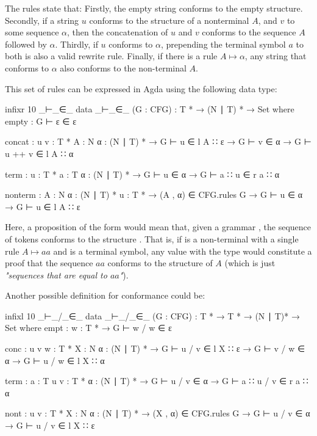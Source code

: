	The rules state that: Firstly, the empty string conforms to the empty
	structure. Secondly, if a string $u$ conforms to the structure of a
	nonterminal $A$, and $v$ to some sequence $\alpha$, then the concatenation
	of $u$ and $v$ conforms to the sequence $A$ followed by $\alpha$. Thirdly,
	if $u$ conforms to $\alpha$, prepending the terminal symbol $a$ to both is
	also a valid rewrite rule. Finally, if there is a rule $A \mapsto \alpha$,
	any string that conforms to $\alpha$ also conforms to the non-terminal $A$.

	This set of rules can be expressed in Agda using the following data type:

	\begin{code}
		infixr 10 _⊢_∈_
		data _⊢_∈_ (G : CFG) :  T * → (N ∣ T) * → Set where
		  empty :
		    G ⊢ ε ∈ ε

		  concat : {u v : T *} {A : N} {α : (N ∣ T) *} →
		    G ⊢ u ∈ l A ∷ ε → G ⊢ v ∈ α → G ⊢ u ++ v ∈ l A ∷ α

		  term : {u : T *} {a : T} {α : (N ∣ T) *} →
		    G ⊢ u ∈ α → G ⊢ a ∷ u ∈ r a ∷ α

		  nonterm : {A : N} {α : (N ∣ T) *} {u : T *} →
		    (A , α) ∈ CFG.rules G → G ⊢ u ∈ α → G ⊢ u ∈ l A ∷ ε
	\end{code}

	Here, a proposition of the form  would mean that, given a
	grammar , the sequence of tokens  conforms to the
	structure . That is, if  is a non-terminal with a
	single rule $A \mapsto aa$ and  is a terminal symbol, any value
	with the type  would constitute a proof
	that the sequence $aa$ conforms to the structure of $A$ (which is just
	\emph{"sequences that are equal to $aa$"}).

	Another possible definition for conformance could be:

	\begin{code}
		infixl 10 _⊢_/_∈_
		data _⊢_/_∈_ (G : CFG) : T * → T * → (N ∣ T)* → Set where
		  empt : {w : T *} →
		    G ⊢ w / w ∈ ε

		  conc : {u v w : T *} {X : N} {α : (N ∣ T) *} →
		    G ⊢ u / v ∈ l X ∷ ε →
		    G ⊢ v / w ∈ α →
		    G ⊢ u / w ∈ l X ∷ α

		  term : {a : T} {u v : T *} {α : (N ∣ T) *} →
		    G ⊢ u / v ∈ α →
		    G ⊢ a ∷ u / v ∈ r a ∷ α

		  nont : {u v : T *} {X : N} {α : (N ∣ T) *} →
		    (X , α) ∈ CFG.rules G →
		    G ⊢ u / v ∈ α →
		    G ⊢ u / v ∈ l X ∷ ε
	\end{code}

